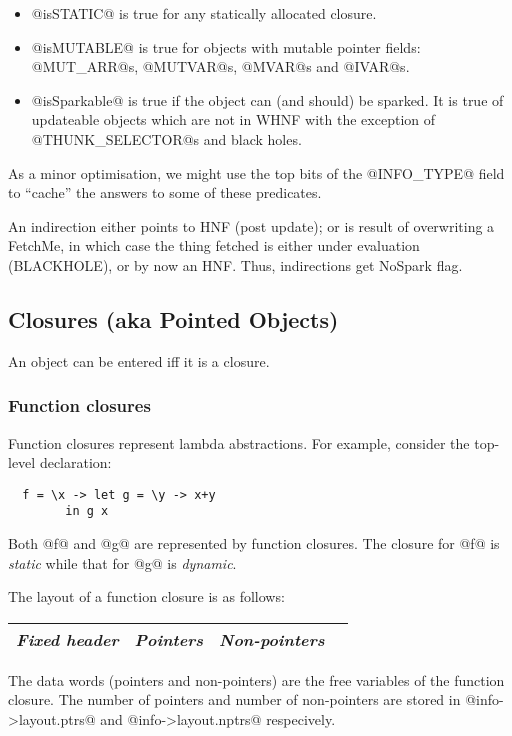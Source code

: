 \documentclass[11pt]{article}
\newcommand{\Subsubsection}[2]{\subsubsection{#1}\label{sec:#2}}
\begin{document}
\begin{itemize}

\item @isSTATIC@ is true for any statically allocated closure.

\item @isMUTABLE@ is true for objects with mutable pointer fields:
  @MUT_ARR@s, @MUTVAR@s, @MVAR@s and @IVAR@s.

\item @isSparkable@ is true if the object can (and should) be sparked.
It is true of updateable objects which are not in WHNF with the
exception of @THUNK_SELECTOR@s and black holes.

\end{itemize}

As a minor optimisation, we might use the top bits of the @INFO_TYPE@
field to ``cache'' the answers to some of these predicates.

An indirection either points to HNF (post update); or is result of
overwriting a FetchMe, in which case the thing fetched is either under
evaluation (BLACKHOLE), or by now an HNF.  Thus, indirections get
NoSpark flag.

\subsection{Closures (aka Pointed Objects)}

An object can be entered iff it is a closure.

\Subsubsection{Function closures}{FUN}

Function closures represent lambda abstractions.  For example,
consider the top-level declaration:
\begin{verbatim}
  f = \x -> let g = \y -> x+y
	    in g x
\end{verbatim}
Both @f@ and @g@ are represented by function closures.  The closure
for @f@ is \emph{static} while that for @g@ is \emph{dynamic}.

The layout of a function closure is as follows:
\begin{center}
\begin{tabular}{|l|l|l|l|}\hline
\emph{Fixed header}  & \emph{Pointers} & \emph{Non-pointers} \\ \hline
\end{tabular}
\end{center}

The data words (pointers and non-pointers) are the free variables of
the function closure.  The number of pointers and number of
non-pointers are stored in @info->layout.ptrs@ and
@info->layout.nptrs@ respecively.
\end{document}
